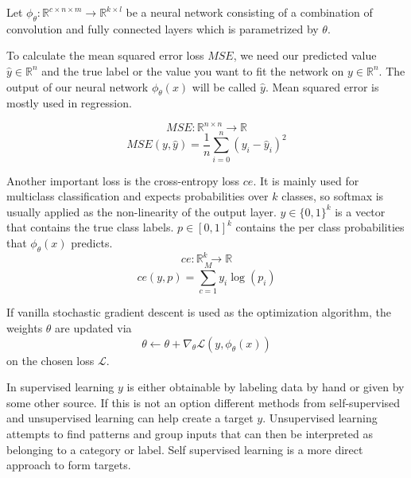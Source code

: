 \documentclass{article}
\begin{document}
\noindent Let $\phi_\theta: \mathbb{R}^{c \times n \times m} \xrightarrow{} \mathbb{R}^{k \times l}$ be a neural network consisting of a combination of convolution and fully connected layers which is parametrized by $\theta$.

\noindent To calculate the mean squared error loss $MSE$, 
we need our predicted value $\hat y \in \mathbb{R}^{n}$ and the true
label or the value you want to fit the network on $y \in \mathbb{R}^{n}$.
The output of our neural network $\phi_\theta(x)$ will be called $\hat{y}$. 
Mean squared error is mostly used in regression.

\begin{equation}
    MSE: \mathbb{R}^{n \times n} \xrightarrow{} \mathbb{R}
\end{equation}
\begin{equation*}
    MSE(y, \hat{y}) = \frac{1}{n} \sum_{i=0}^{n} (y_i-\hat{y}_i)^2
\end{equation*}

\noindent Another important loss is the cross-entropy loss $ce$. It is mainly used for multiclass classification and expects
probabilities over $k$ classes, so softmax is usually applied as the non-linearity of the output layer.
$y \in \{0, 1\}^{k}$ is a vector that contains the true class labels. $p \in [0, 1]^{k}$ contains
the per class probabilities that $\phi_\theta(x)$ predicts.
\begin{equation}
    ce: \mathbb{R}^{k} \xrightarrow{} \mathbb{R}
\end{equation}
\begin{equation*}
    ce(y, p) = \sum_{c=1}^My_{i}\log(p_{i})
\end{equation*}

\noindent If vanilla stochastic gradient descent is used as the optimization algorithm, the weights $\theta$
are updated via 
\begin{equation}
    \theta \xleftarrow{} \theta + \nabla_\theta {\mathcal L}(y, \phi_\theta(x))
\end{equation}
on the chosen loss ${\mathcal L}$.

\noindent In supervised learning $y$ is either obtainable by labeling data by hand or given
by some other source. If this is not an option different methods from
self-supervised and unsupervised learning can help create a target $y$.\newline
Unsupervised learning attempts to find patterns and group inputs that can then be 
interpreted as belonging to a category or label.
Self supervised learning is a more direct approach to form targets.
\end{document}
